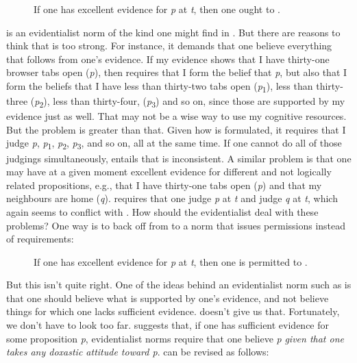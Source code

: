 \documentclass[12pt]{article}
\begin{document}
\begin{description}
    \item[\eo] If one has excellent evidence for \textit{p} at \textit{t}, then one ought to \jud{}.
\end{description}
%
\eo{} is an evidentialist norm of the kind one might find in \textcite{conee_evidentialism_2004}. But there are reasons to think that \eo{} is too strong. For instance, it demands that one believe everything that follows from one's evidence. If my evidence shows that I have thirty-one browser tabs open (\textit{p}), then \eo{} requires that I form the belief that \textit{p}, but also that I form the beliefs that I have less than thirty-two tabs open (\textit{p}\textsubscript{1}), less than thirty-three (\textit{p}\textsubscript{2}), less than thirty-four, (\textit{p}\textsubscript{3}) and so on, since those are supported by my evidence just as well. That may not be a wise way to use my cognitive resources. But the problem is greater than that. Given how \eo{} is formulated, it requires that I judge \textit{p}, \textit{p}\textsubscript{1}, \textit{p}\textsubscript{2}, \textit{p}\textsubscript{3}, and so on, all at the same time. If one cannot do all of those judgings simultaneously, \opic{} entails that \eo{} is inconsistent. A similar problem is that one may have at a given moment excellent evidence for different and not logically related propositions, e.g., that I have thirty-one tabs open (\textit{p}) and that my neighbours are home (\textit{q}). \eo{} requires that one judge \textit{p} at \textit{t} and judge \textit{q} at \textit{t}, which again seems to conflict with \opic{}. How should the evidentialist deal with these problems? One way is to back off from \eo{} to a norm that issues permissions instead of requirements:

\begin{description}
    \item[\ep] If one has excellent evidence for \textit{p} at \textit{t}, then one is permitted to \jud{}.
\end{description}
%
But this isn't quite right. One of the ideas behind an evidentialist norm such as \eo{} is that one should believe what is supported by one's evidence, and not believe things for which one lacks sufficient evidence. \ep{} doesn't give us that. Fortunately, we don't have to look too far. \textcite{feldman_ethics_2000} suggests that, if one has sufficient evidence for some proposition \textit{p}, evidentialist norms require that one believe \textit{p} \textit{given that one takes any doxastic attitude toward p}. \eo{} can be revised as follows:
\end{document}
